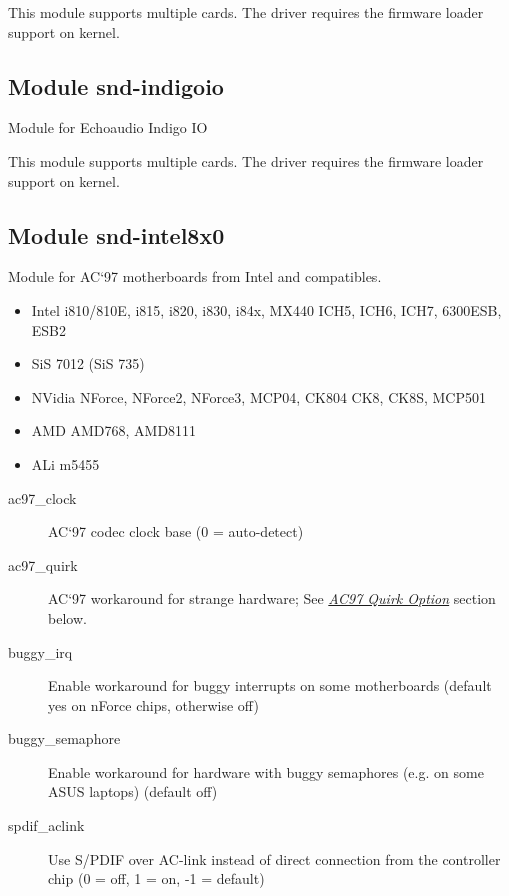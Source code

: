 \documentclass[a4paper,8pt,english]{sphinxmanual}
\begin{document}
This module supports multiple cards.
The driver requires the firmware loader support on kernel.


\subsection{Module snd-indigoio}
\label{sound/alsa-configuration:module-snd-indigoio}
Module for Echoaudio Indigo IO

This module supports multiple cards.
The driver requires the firmware loader support on kernel.


\subsection{Module snd-intel8x0}
\label{sound/alsa-configuration:module-snd-intel8x0}
Module for AC`97 motherboards from Intel and compatibles.
\begin{itemize}
\item {} 
Intel i810/810E, i815, i820, i830, i84x, MX440 ICH5, ICH6, ICH7,
6300ESB, ESB2

\item {} 
SiS 7012 (SiS 735)

\item {} 
NVidia NForce, NForce2, NForce3, MCP04, CK804 CK8, CK8S, MCP501

\item {} 
AMD AMD768, AMD8111

\item {} 
ALi m5455

\end{itemize}
\begin{description}
\item[{ac97\_clock}] \leavevmode
AC`97 codec clock base (0 = auto-detect)

\item[{ac97\_quirk}] \leavevmode
AC`97 workaround for strange hardware;
See {\hyperref[sound/alsa\string-configuration:ac97\string-quirk\string-option]{\emph{AC97 Quirk Option}}} section below.

\item[{buggy\_irq}] \leavevmode
Enable workaround for buggy interrupts on some motherboards
(default yes on nForce chips, otherwise off)

\item[{buggy\_semaphore}] \leavevmode
Enable workaround for hardware with buggy semaphores (e.g. on some
ASUS laptops) (default off)

\item[{spdif\_aclink}] \leavevmode
Use S/PDIF over AC-link instead of direct connection from the
controller chip (0 = off, 1 = on, -1 = default)

\end{description}
\end{document}
